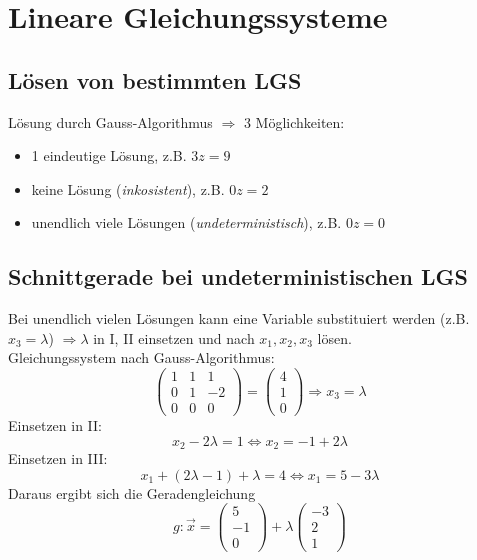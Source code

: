 
\section{Lineare Gleichungssysteme}
\label{sec:lineare_gleichungssysteme}

\subsection{Lösen von bestimmten LGS}
\label{sub:lösen_von_bestimmten_lgs}

Lösung durch Gauss-Algorithmus $\Rightarrow$ 3 Möglichkeiten:

\begin{itemize}
	\item 1 eindeutige Lösung, z.B. $3z = 9$
	\item keine Lösung (\emph{inkosistent}), z.B. $0z = 2$
	\item unendlich viele Lösungen (\emph{undeterministisch}), z.B. $0z = 0$
\end{itemize}

\subsection{Schnittgerade bei undeterministischen LGS}
\label{sub:schnittgerade_bei_undeterministischen_lgs}

Bei unendlich vielen Lösungen kann eine Variable substituiert werden (z.B. $x_3 = \lambda$) $\Rightarrow \lambda$ 
in I, II einsetzen und nach $x_1, x_2, x_3$ lösen.\\
Gleichungssystem nach Gauss-Algorithmus:
\begin{displaymath}
	\left(\begin{matrix}
		1 & 1 & 1 \\ 0 & 1 & -2 \\ 0 & 0 & 0
	\end{matrix}\right)	
	= \left(\begin{matrix}
		4 \\ 1 \\ 0
	\end{matrix}\right) \Rightarrow x_3 = \lambda
\end{displaymath}
Einsetzen in II:
\begin{displaymath} x_2 - 2 \lambda = 1 \Leftrightarrow x_2 = -1 + 2 \lambda \end{displaymath}
Einsetzen in III:
\begin{displaymath} x_1 + (2\lambda -1) + \lambda = 4 \Leftrightarrow x_1 = 5 - 3\lambda \end{displaymath}
Daraus ergibt sich die Geradengleichung
\begin{displaymath}
	g: \overrightarrow{x} = \left(\begin{matrix}5\\-1\\0\end{matrix}\right) + \lambda
	\left(\begin{matrix}-3\\2\\1\end{matrix}\right)
\end{displaymath}
